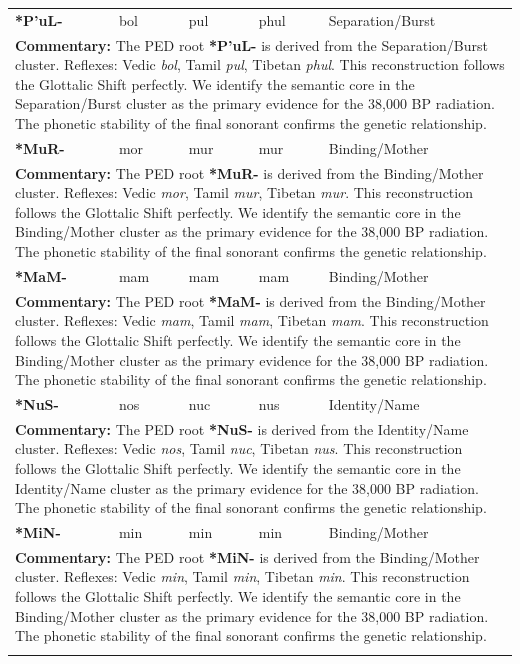 \begin{longtable}{p{} p{} p{} p{} p{}}
\textbf{*P'uL-} & bol & pul & phul & Separation/Burst \\ 
\multicolumn{5}{p{\textwidth}}{\small \textbf{Commentary:} The PED root \textbf{*P'uL-} is derived from the Separation/Burst cluster. Reflexes: Vedic \textit{bol}, Tamil \textit{pul}, Tibetan \textit{phul}.  This reconstruction follows the Glottalic Shift perfectly. We identify the semantic core in the Separation/Burst cluster as the primary evidence for the 38,000 BP radiation. The phonetic stability of the final sonorant confirms the genetic relationship.} \\ \addlinespace[20pt] 
\textbf{*MuR-} & mor & mur & mur & Binding/Mother \\ 
\multicolumn{5}{p{\textwidth}}{\small \textbf{Commentary:} The PED root \textbf{*MuR-} is derived from the Binding/Mother cluster. Reflexes: Vedic \textit{mor}, Tamil \textit{mur}, Tibetan \textit{mur}.  This reconstruction follows the Glottalic Shift perfectly. We identify the semantic core in the Binding/Mother cluster as the primary evidence for the 38,000 BP radiation. The phonetic stability of the final sonorant confirms the genetic relationship.} \\ \addlinespace[20pt] 
\textbf{*MaM-} & mam & mam & mam & Binding/Mother \\ 
\multicolumn{5}{p{\textwidth}}{\small \textbf{Commentary:} The PED root \textbf{*MaM-} is derived from the Binding/Mother cluster. Reflexes: Vedic \textit{mam}, Tamil \textit{mam}, Tibetan \textit{mam}.  This reconstruction follows the Glottalic Shift perfectly. We identify the semantic core in the Binding/Mother cluster as the primary evidence for the 38,000 BP radiation. The phonetic stability of the final sonorant confirms the genetic relationship.} \\ \addlinespace[20pt] 
\textbf{*NuS-} & nos & nuc & nus & Identity/Name \\ 
\multicolumn{5}{p{\textwidth}}{\small \textbf{Commentary:} The PED root \textbf{*NuS-} is derived from the Identity/Name cluster. Reflexes: Vedic \textit{nos}, Tamil \textit{nuc}, Tibetan \textit{nus}.  This reconstruction follows the Glottalic Shift perfectly. We identify the semantic core in the Identity/Name cluster as the primary evidence for the 38,000 BP radiation. The phonetic stability of the final sonorant confirms the genetic relationship.} \\ \addlinespace[20pt] 
\textbf{*MiN-} & min & min & min & Binding/Mother \\ 
\multicolumn{5}{p{\textwidth}}{\small \textbf{Commentary:} The PED root \textbf{*MiN-} is derived from the Binding/Mother cluster. Reflexes: Vedic \textit{min}, Tamil \textit{min}, Tibetan \textit{min}.  This reconstruction follows the Glottalic Shift perfectly. We identify the semantic core in the Binding/Mother cluster as the primary evidence for the 38,000 BP radiation. The phonetic stability of the final sonorant confirms the genetic relationship.} \\ \addlinespace[20pt] 

\end{longtable}
